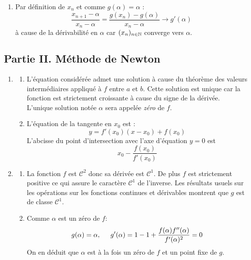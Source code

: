 \begin{enumerate}
\begin{enumerate}
\item Par définition de $x_n$ et comme $g(\alpha)=\alpha$ :
\begin{displaymath}
 \frac{x_{n+1}-\alpha}{x_n -\alpha}=\frac{g(x_n)-g(\alpha)}{x_n -\alpha} \rightarrow g'(\alpha)
\end{displaymath}
à cause de la dérivabilité en $\alpha$ car $(x_n)_{n\in \mathbb{N}}$ converge vers $\alpha$.
\end{enumerate}
\end{enumerate}

\subsection*{Partie II. Méthode de Newton}
\begin{enumerate}
 \item \begin{enumerate}
 \item L'équation considérée admet une solution à cause du théorème des valeurs intermédiaires appliqué à $f$ entre $a$ et $b$. Cette solution est unique car la fonction est strictement croissante à cause du signe de la dérivée. L'unique solution notée $\alpha$ sera appelée \emph{zéro} de $f$.
\item L'équation de la tangente en $x_0$ est :
\begin{displaymath}
 y = f'(x_0)(x-x_0)+f(x_0)
\end{displaymath}
L'abcisse du point d'intersection avec l'axe d'équation $y=0$ est
\begin{displaymath}
 x_0 - \frac{f(x_0)}{f'(x_0)}
\end{displaymath}
\end{enumerate}

\item 
\begin{enumerate}
 \item La fonction $f$ est $\mathcal C^2$ donc sa dérivée est $\mathcal C^1$. De plus $f$ est strictement positive ce qui assure le caractère $\mathcal C^1$ de l'inverse. Les résultats usuels sur les opérations sur les fonctions continues et dérivables montrent que $g$ est de classe $\mathcal C^1$. 
\item Comme $\alpha$ est un zéro de $f$:
\begin{displaymath}
 g(\alpha)=\alpha, \hspace{0.5cm} g'(\alpha) = 1 -1 +\frac{f(\alpha)f''(\alpha)}{f'(\alpha)^2} = 0
\end{displaymath}
On en déduit que $\alpha$ est à la fois un zéro de $f$ et un point fixe de $g$.
\end{enumerate}


\end{enumerate}
